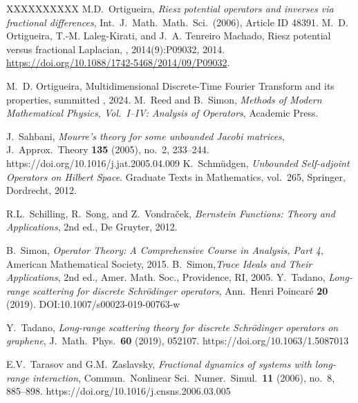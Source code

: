 \documentclass[10pt]{amsart} %
\newcommand{\1}{{\mathbb{I}}}
\numberwithin{equation}{section}
\begin{document}
\begin{thebibliography}{XXXXXXXXXX}
 M.D.\ Ortigueira, \emph{Riesz potential operators and inverses via fractional differences}, Int.\ J.\ Math.\ Math.\ Sci.\ (2006), Article ID 48391.
M.~D. Ortigueira, T.-M. Laleg-Kirati, and J.~A. Tenreiro Machado,
\newblock Riesz potential versus fractional Laplacian,
, 2014(9):P09032, 2014.
\newblock \url{https://doi.org/10.1088/1742-5468/2014/09/P09032}.

M.~D. Ortigueira,
\newblock Multidimensional Discrete-Time Fourier Transform and its properties,
\newblock summitted , 2024.
 M.\ Reed and B.\ Simon, \emph{Methods of Modern Mathematical Physics, Vol.\ I--IV: Analysis of Operators}, Academic Press.



 J.\ Sahbani, \emph{Mourre's theory for some unbounded Jacobi matrices}, J.\ Approx.\ Theory {\bf 135} (2005), no.\ 2, 233--244. https://doi.org/10.1016/j.jat.2005.04.009
K.~Schmüdgen,
\emph {\em Unbounded Self-adjoint Operators on Hilbert Space}.
 Graduate Texts in Mathematics, vol.~265, Springer, Dordrecht, 2012.

 R.L.\ Schilling, R.\ Song, and Z.\ Vondra\v{c}ek, \emph{Bernstein Functions: Theory and Applications}, 2nd ed., De Gruyter, 2012.


 B.\ Simon, \emph{Operator Theory: A Comprehensive Course in Analysis, Part 4}, American Mathematical Society, 2015.
B.~Simon,\emph{Trace Ideals and Their Applications}, 2nd ed.,
Amer. Math. Soc., Providence, RI, 2005.
 Y.\ Tadano, \emph{Long-range scattering for discrete Schr\"odinger operators}, Ann.\ Henri Poincar\'e {\bf 20} (2019). DOI:10.1007/s00023-019-00763-w

 Y.\ Tadano, \emph{Long-range scattering theory for discrete Schr\"odinger operators on graphene}, J.\ Math.\ Phys.\ {\bf 60} (2019), 052107. https://doi.org/10.1063/1.5087013

 E.V.\ Tarasov and G.M.\ Zaslavsky, \emph{Fractional dynamics of systems with long-range interaction}, Commun.\ Nonlinear Sci.\ Numer.\ Simul.\ {\bf 11} (2006), no.\ 8, 885--898. https://doi.org/10.1016/j.cnsns.2006.03.005
\end{thebibliography}
\end{document}
